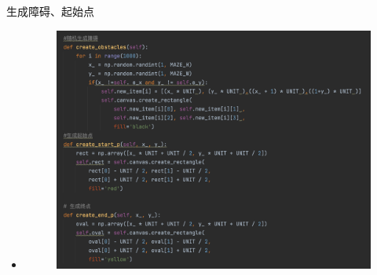 \documentclass{beamer}
\begin{document}
\begin{frame}{生成障碍、起始点}
    \begin{itemize}
    \tiny
        \item 
        \begin{minipage}{1\linewidth}
        \medskip
        \begin{figure}[h]
            \centering
            \includegraphics[height=.8\textheight]{pic/13.png}
        \end{figure}
    \end{minipage}
    \end{itemize}
\end{frame}
\end{document}
